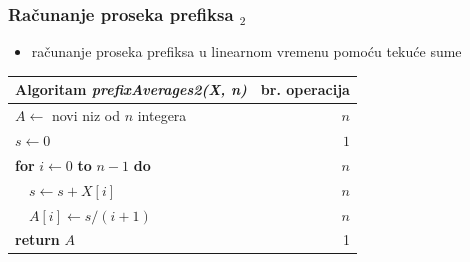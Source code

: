 \documentclass[compress]{beamer}
\begin{document}
\begin{frame}[fragile]
  \frametitle{Računanje proseka prefiksa $_2$}
  \begin{itemize}
    \item računanje proseka prefiksa u linearnom vremenu pomoću tekuće sume
  \end{itemize}
  \begin{center}
    \begin{tabular}{l|r}
      \textbf{Algoritam} \textit{prefixAverages2(X, n)} & \textbf{br. operacija} \\ \hline
      $A \leftarrow$ novi niz od $n$ integera & $n$ \\
      $s \leftarrow 0$ & $1$ \\
      \textbf{for} $i \leftarrow 0$ \textbf{to} $n - 1$ \textbf{do} & $n$ \\
      \ \ $s \leftarrow s + X[i]$ & $n$ \\
      \ \ $A[i] \leftarrow s/(i+1)$ & $n$ \\
      \textbf{return} $A$ & 1
    \end{tabular}
  \end{center}
\end{frame}
\end{document}
